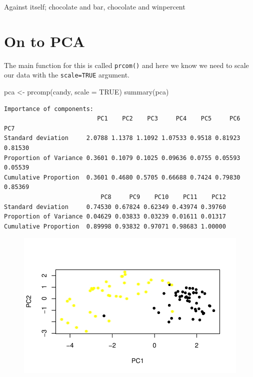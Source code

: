 \documentclass[
  letterpaper,
  DIV=11,
  numbers=noendperiod]{scrartcl}
\newenvironment{Shaded}{\begin{snugshade}}{\end{snugshade}}
\newcommand{\AttributeTok}[1]{\textcolor[rgb]{0.40,0.45,0.13}{#1}}
\newcommand{\ConstantTok}[1]{\textcolor[rgb]{0.56,0.35,0.01}{#1}}
\newcommand{\DecValTok}[1]{\textcolor[rgb]{0.68,0.00,0.00}{#1}}
\newcommand{\FunctionTok}[1]{\textcolor[rgb]{0.28,0.35,0.67}{#1}}
\newcommand{\NormalTok}[1]{\textcolor[rgb]{0.00,0.23,0.31}{#1}}
\newcommand{\OtherTok}[1]{\textcolor[rgb]{0.00,0.23,0.31}{#1}}
\newcommand{\SpecialCharTok}[1]{\textcolor[rgb]{0.37,0.37,0.37}{#1}}
\begin{document}
Against itself; chocolate and bar, chocolate and winpercent

\hypertarget{on-to-pca}{%
\section{On to PCA}\label{on-to-pca}}

The main function for this is called \texttt{prcom()} and here we know
we need to scale our data with the \texttt{scale=TRUE} argument.

\begin{Shaded}
\begin{Highlighting}[]
\NormalTok{pca }\OtherTok{\textless{}{-}} \FunctionTok{prcomp}\NormalTok{(candy, }\AttributeTok{scale =} \ConstantTok{TRUE}\NormalTok{)}
\FunctionTok{summary}\NormalTok{(pca)}
\end{Highlighting}
\end{Shaded}

\begin{verbatim}
Importance of components:
                          PC1    PC2    PC3     PC4    PC5     PC6     PC7
Standard deviation     2.0788 1.1378 1.1092 1.07533 0.9518 0.81923 0.81530
Proportion of Variance 0.3601 0.1079 0.1025 0.09636 0.0755 0.05593 0.05539
Cumulative Proportion  0.3601 0.4680 0.5705 0.66688 0.7424 0.79830 0.85369
                           PC8     PC9    PC10    PC11    PC12
Standard deviation     0.74530 0.67824 0.62349 0.43974 0.39760
Proportion of Variance 0.04629 0.03833 0.03239 0.01611 0.01317
Cumulative Proportion  0.89998 0.93832 0.97071 0.98683 1.00000
\end{verbatim}

\begin{Shaded}
\end{Shaded}

\begin{figure}[H]

{\centering \includegraphics{Class-9_files/figure-pdf/unnamed-chunk-27-1.pdf}

}

\end{figure}
\end{document}
